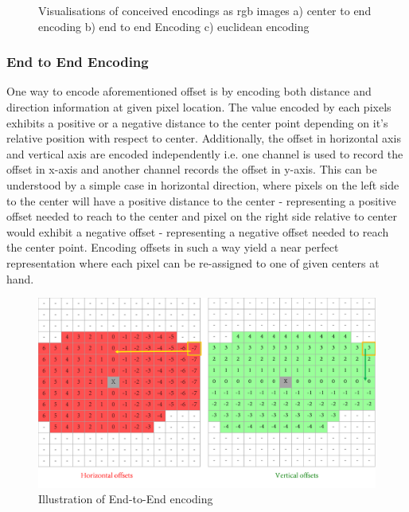 \begin{figure}[!ht]
{        \label{fig:euc_img_vis}}
        \caption[RGB Visualisation of Offset Vectors Encoding]{Visualisations of conceived encodings as rgb images a) center to end encoding b) end to end Encoding c) euclidean encoding}
        \label{fig:RGB_encodings}
\end{figure}

\subsubsection{End to End Encoding}
\label{subsec:e2e}
One way to encode aforementioned offset is by encoding both distance and direction information at given pixel location. The value encoded by each pixels exhibits a positive or a negative distance to the center point depending on it's relative position with respect to center. Additionally, the offset in horizontal axis and vertical axis are encoded independently i.e. one channel is used to record the offset in x-axis and another channel records the offset in y-axis. This can be understood by a simple case in horizontal direction, where pixels on the left side to the center will have a positive distance to the center - representing a positive offset needed to reach to the center and pixel on the right side relative to center would exhibit a negative offset - representing a negative offset needed to reach the center point.  Encoding offsets in such a way yield a near perfect representation where each pixel can be re-assigned to one of given centers at hand.  
\begin{figure}[!ht]
    \includegraphics[width = \textwidth]{Graphics/Data_Representation/c2e_Encoding.pdf}
    \caption[Center to End Encoding]{Illustration of End-to-End encoding}
    \label{fig:e2e_vis_pixels}

\end{figure}

